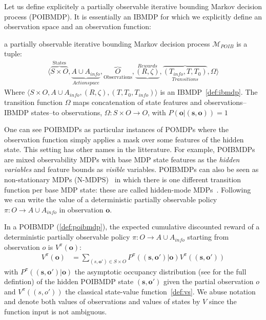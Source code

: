 Let us define explicitely a partially observable iterative bounding Markov decision process (POIBMDP). It is essentially an IBMDP for which we explicitly define an observation space and an observation function:
\begin{definition}\label{def:poibmdp} a partially observable iterative bounding Markov decision process $\mathcal{M}_{POIB}$ is a tuple:
    \begin{align*}
        \langle \overbrace{S\times O}^{\text{States}}, \underbrace{A\cup A_{info}}_{Action space},\overbrace{O}_{\text{Observations}} ,\underbrace{(R, \zeta)}^{Rewards}, \overbrace{(T_{info}, T, T_0)}_{Transitions}, \Omega \rangle
    \end{align*}
    Where $\langle S\times O, A\cup A_{info}, (R, \zeta),( T, T_0, T_{info})\rangle$ is an IBMDP~\ref{def:ibmdp}.
    The transition function $\Omega$ maps concatenation of state features and observations--IBMDP states--to observations, $\Omega:S\times O \rightarrow O$, with $P(\boldsymbol{o}|(\boldsymbol{s}, \boldsymbol{o}))=1$ 
\end{definition}

One can see POIBMDPs as particular instances of POMDPs where the observation function simply applies a mask over some features of the hidden state.
This setting has other names in the litterature.
For example, POIBMDPs are mixed observability MDPs \cite{momdp} with base MDP state features as the \textit{hidden variables} and feature bounds as \textit{visible} variables.
POIBMDPs can also be seen as non-stationary MDPs (N-MDPS)~\cite{learning-pomdp} in which there is one different transition function per base MDP state: these are called hidden-mode MDPs~\cite{hmmdp}.
Following~\cite{learning-pomdp} we can write the value of a deterministic partially observable policy $\pi:O\rightarrow A\cup A_{info}$ in observation $\boldsymbol{o}$.

\begin{definition}\label{def:vpo} In a POIBMDP (\ref{def:poibmdp}), the expected cumulative discounted reward of a deterministic partially observable policy $\pi:O\rightarrow A\cup A_{info}$ starting from observation $o$ is $V^{\pi}(\boldsymbol{o})$:
    \begin{align*}
        V^{\pi}(\boldsymbol{o}) &= \underset{(s,\boldsymbol{o}')\in S\times O}{\sum}P^{\pi}((\boldsymbol{s}, \boldsymbol{o}')|\boldsymbol{o})V^{\pi}((\boldsymbol{s}, \boldsymbol{o}'))
    \end{align*}
with $P^{\pi}((\boldsymbol{s}, \boldsymbol{o}')|\boldsymbol{o})$ the asymptotic occupancy distribution (see \cite[section 4]{learning-pomdp} for the full defintion) of the hidden POIBMDP state $(\boldsymbol{s},\boldsymbol{o}')$ given the partial observation $o$ and $V^{\pi}((s, o'))$ the classical state-value function~\ref{def:vs}.
We abuse notation and denote both values of observations and values of states by $V$ since the function input is not ambiguous.
\end{definition}

